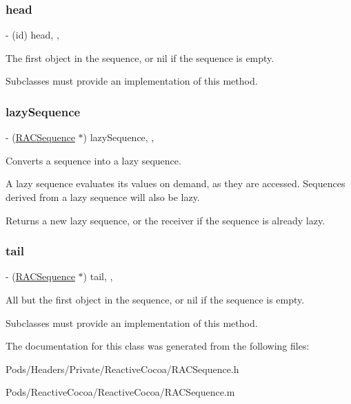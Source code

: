\subsubsection{\texorpdfstring{head}{head}}
{\footnotesize\ttfamily -\/ (id) head\hspace{0.3cm}{\ttfamily [read]}, {\ttfamily [nonatomic]}, {\ttfamily [strong]}}

The first object in the sequence, or nil if the sequence is empty.

Subclasses must provide an implementation of this method. \mbox{\label{interface_r_a_c_sequence_adef358cf047b81c9ed2aa3a4bfee2201}} 
\subsubsection{\texorpdfstring{lazy\+Sequence}{lazySequence}}
{\footnotesize\ttfamily -\/ (\mbox{\hyperlink{interface_r_a_c_sequence}{R\+A\+C\+Sequence}} $\ast$) lazy\+Sequence\hspace{0.3cm}{\ttfamily [read]}, {\ttfamily [nonatomic]}, {\ttfamily [copy]}}

Converts a sequence into a lazy sequence.

A lazy sequence evaluates its values on demand, as they are accessed. Sequences derived from a lazy sequence will also be lazy.

Returns a new lazy sequence, or the receiver if the sequence is already lazy. \mbox{\label{interface_r_a_c_sequence_a1cb6f0b82957ba1a7898ced27b77aa43}} 
\subsubsection{\texorpdfstring{tail}{tail}}
{\footnotesize\ttfamily -\/ (\mbox{\hyperlink{interface_r_a_c_sequence}{R\+A\+C\+Sequence}} $\ast$) tail\hspace{0.3cm}{\ttfamily [read]}, {\ttfamily [nonatomic]}, {\ttfamily [strong]}}

All but the first object in the sequence, or nil if the sequence is empty.

Subclasses must provide an implementation of this method. 

The documentation for this class was generated from the following files\+:\begin{DoxyCompactItemize}
\item 
Pods/\+Headers/\+Private/\+Reactive\+Cocoa/R\+A\+C\+Sequence.\+h\item 
Pods/\+Reactive\+Cocoa/\+Reactive\+Cocoa/R\+A\+C\+Sequence.\+m\end{DoxyCompactItemize}
